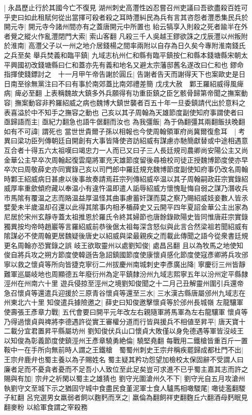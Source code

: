 |{
	永昌歷止行於其國今亡不復見}
湖州刺史高灃性凶忍嘗召州吏議曰吾欲盡殺百姓可乎吏曰如此租賦何從出當擇可殺者殺之耳時灃糾民為兵有言其咨怨者灃悉集民兵於開元寺|{
	開元寺今諸州間亦有之蓋唐開元中所置也}
紿云犒享入則殺之死者踰半在外者覺之縱火作亂灃閉門大索|{
	索山客翻}
凡殺三千人吳越王鏐欲誅之戊辰灃以州叛附於淮南|{
	高灃父子以一州之地介居錢楊之間率兩附以自存為日久矣今專附淮南錢氏之兵至矣}
舉兵焚義和臨平鎮|{
	九域志杭州仁和縣有臨平鎮按仁和縣本錢塘縣宋朝太平興國初改錢塘縣曰仁和蓋亦先有義和地名又避太宗藩邸舊名遂改曰仁和也}
鏐命指揮使錢鏢討之　十一月甲午帝告謝於圓丘|{
	告謝者告天而謝得天下也案歐史是日日南至徐無黨注曰不曰有事於南郊蓋比南郊禮差簡}
戊戌大赦　鄴王羅紹威得風痺病|{
	痺必至翻}
上表稱魏故大鎮多外兵願得有功重臣鎮之臣乞骸骨歸第帝聞之撫案動容|{
	撫案動容非矜羅紹威之病也魏博大鎮世襲者百五十年一旦委鎮請代出於意料之表喜溢於中不知手之撫容之動也}
己亥以其子周翰為天雄節度副使知府事謂使者曰亟歸語而主|{
	亟紀力翻急也語牛倨翻而汝也}
為我彊飯|{
	為于偽翻彊其兩翻飯扶晚翻}
如有不可諱|{
	謂死也}
當世世貴爾子孫以相報也今使周翰領軍府尚冀爾復愈耳　|{
	考異曰梁功臣列傳朝廷自開創有大事皆降使咨訪紹威有謀慮亦馳簡獻替或中途相遇意互合者十得五六太祖嘆曰竭忠力一人而已又曰子三人長廷規司農卿尚安陽公主又尚金華公主早卒次周翰起復雲麾將軍充天雄節度留後尋檢校司徒正授魏博節度使亦早卒次曰周敬薛史亦同實錄己亥以司門郎中羅廷規充魏博節度副使知府事仍改名周翰時鄴王紹威病日甚慮以後事故奏請焉莊宗列傳紹威卒温以其子周翰嗣政莊宗實錄紹威厚率重歛傾府藏以奉温小有違忤温即遣人詬辱紹威方懷愧耻悔自弱之謀乃潛收兵市馬隂有覆温之志而賂温益厚温怪其曲事慮蓄奸謀而莫之察乃賜紹威妓妾數人皆氶嬖愛未半歲温却召還以此得其隂事内相矛楯薛史又云開平四年夏詔金華公主出家為尼居於宋州玄靜寺蓋太祖推恩於羅氏令終其婦節也唐餘錄歐陽史皆同惟唐莊宗實錄獨異按均帝時趙巖等言羅紹威前恭後倨太祖每深含怒似與此言合然梁祖若聞紹威有隂謀必不使周翰更居魏疑後唐史以紹威與梁最親疾之而載此傳聞之語今從衆書廷規更名周翰亦恐實錄之誤}
岐王欲取靈州以處劉知俊|{
	處昌呂翻}
且以為牧馬之地使知俊自將兵攻之朔方節度使韓遜告急詔鎮國節度使康懷貞感化節度使寇彥卿將兵攻邠寧以救之懷貞等所向皆捷克寧衍二州拔慶州南城刺史李彥廣出降|{
	寧慶衍三州皆靜難軍巡屬岐地也周顯德五年廢衍州為定平鎮隸汾州九域志熙寧五年以汾州定平縣隸涇州在州南六十里}
遊兵侵掠至涇州之境劉知俊聞之十二月己丑解靈州圍引兵還帝急召懷貞等還遣兵迎援於三原青谷懷貞等還至三水|{
	三水漢古縣唐屬邠州九域志在州東北六十里}
知俊遣兵據險邀之|{
	薛史曰知俊邀擊懷貞等於邠州長城嶺}
左龍驤軍使壽張王彥章力戰|{
	五代會要曰開平元年改左右親隨軍將馬軍為左右龍驤軍}
懷貞等乃得過懷貞與禆將李德遇許從實王審權分道而行皆與援兵不相値至昇平|{
	唐天寶十二載分宜君置昇平縣屬坊州}
劉知俊伏兵山口懷貞大敗僅以身免德遇等軍皆沒岐王以知俊為彰義節度使鎮涇州王彥章驍勇絶倫|{
	驍堅堯翻}
每戰用二鐵槍皆重百斤一置鞍中一在手所向無前時人謂之王鐵槍　蜀蜀州刺史王宗弁稱疾罷歸成都杜門不出|{
	王宗弁鹿弁也蜀主養以為子賜姓名}
蜀主疑其矜功怨望加檢校太保固辭不受謂人曰廉者足而不憂貪者憂而不足吾小人致位至此足矣豈可求進不已乎蜀主嘉其志而許之賜與有加|{
	宗弁之祈閑以蜀主之雄猜也}
劉守光圍滄州久不下|{
	劉守光自五月攻滄州}
執劉守文至城下示之猶固守城中食盡民食堇泥軍士食人驢馬相噉騣尾|{
	噉徒濫翻騣子紅翻}
呂兖選男女羸弱者飼以麴麫而烹之|{
	羸倫為翻飼祥吏翻麴丘六翻酒母麫眠見翻麥粉}
以給軍食謂之宰殺務

